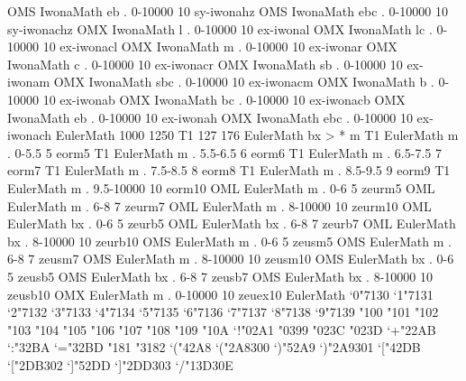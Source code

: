 \declarefont OMS IwonaMath eb  . 0-10000 10 sy-iwonahz
\declarefont OMS IwonaMath ebc . 0-10000 10 sy-iwonachz
\declarefont OMX IwonaMath l   . 0-10000 10 ex-iwonal
\declarefont OMX IwonaMath lc  . 0-10000 10 ex-iwonacl
\declarefont OMX IwonaMath m   . 0-10000 10 ex-iwonar
\declarefont OMX IwonaMath c   . 0-10000 10 ex-iwonacr
\declarefont OMX IwonaMath sb  . 0-10000 10 ex-iwonam
\declarefont OMX IwonaMath sbc . 0-10000 10 ex-iwonacm
\declarefont OMX IwonaMath b   . 0-10000 10 ex-iwonab
\declarefont OMX IwonaMath bc  . 0-10000 10 ex-iwonacb
\declarefont OMX IwonaMath eb  . 0-10000 10 ex-iwonah
\declarefont OMX IwonaMath ebc . 0-10000 10 ex-iwonach
%
%
\declaremathfontfamily EulerMath 1000 1250 T1 127 176
\fontmapseries EulerMath bx > * m
\declarefont T1 EulerMath m . 0-5.5     5  eorm5
\declarefont T1 EulerMath m . 5.5-6.5   6  eorm6
\declarefont T1 EulerMath m . 6.5-7.5   7  eorm7
\declarefont T1 EulerMath m . 7.5-8.5   8  eorm8
\declarefont T1 EulerMath m . 8.5-9.5   9  eorm9
\declarefont T1 EulerMath m . 9.5-10000 10 eorm10
\declarefont OML EulerMath m  . 0-6       5  zeurm5
\declarefont OML EulerMath m  . 6-8       7  zeurm7
\declarefont OML EulerMath m  . 8-10000   10 zeurm10
\declarefont OML EulerMath bx . 0-6       5  zeurb5
\declarefont OML EulerMath bx . 6-8       7  zeurb7
\declarefont OML EulerMath bx . 8-10000   10 zeurb10
\declarefont OMS EulerMath m  . 0-6       5  zeusm5
\declarefont OMS EulerMath m  . 6-8       7  zeusm7
\declarefont OMS EulerMath m  . 8-10000   10 zeusm10
\declarefont OMS EulerMath bx . 0-6       5  zeusb5
\declarefont OMS EulerMath bx . 6-8       7  zeusb7
\declarefont OMS EulerMath bx . 8-10000   10 zeusb10
\declarefont OMX EulerMath m . 0-10000 10 zeuex10
\mathfontfamilyprehook EulerMath {%
  \mathcode`0"7130
  \mathcode`1"7131
  \mathcode`2"7132
  \mathcode`3"7133
  \mathcode`4"7134
  \mathcode`5"7135
  \mathcode`6"7136
  \mathcode`7"7137
  \mathcode`8"7138
  \mathcode`9"7139
  \mathchardef\Gamma"100
  \mathchardef\Delta"101
  \mathchardef\Theta"102
  \mathchardef\Lambda"103
  \mathchardef\Xi"104
  \mathchardef\Pi"105
  \mathchardef\Sigma"106
  \mathchardef\Upsilon"107
  \mathchardef\Phi"108
  \mathchardef\Psi"109
  \mathchardef\Omega"10A
  \let\varsigma\sigma
  \let\varrho\rho
  \mathcode`!"02A1
  \mathchardef\infty"0399
  \mathchardef\Re"023C
  \mathchardef\Im"023D
  \mathcode`+"22AB
  \mathcode`:"32BA
  \mathcode`="32BD
  \mathchardef\bar@minus"181
  \def\relbar{\mathrel{\smash\bar@minus}}%
  \mathchardef\Relbar"3182
  \mathcode`("42A8 \delcode`("2A8300
  \mathcode`)"52A9 \delcode`)"2A9301
  \mathcode`["42DB \delcode`["2DB302
  \mathcode`]"52DD \delcode`]"2DD303
  \delcode`/"13D30E
  \def\rightarrowfill{$\m@th\bar@minus\mkern-6mu%
       \cleaders\hbox{$\mkern-2mu\bar@minus\mkern-2mu$}\hfill
       \mkern-6mu\mathord\rightarrow$}%
  \def\leftarrowfill{$\m@th\mathord\leftarrow\mkern-6mu%
       \cleaders\hbox{$\mkern-2mu\bar@minus\mkern-2mu$}\hfill
       \mkern-6mu\bar@minus$}%
}%
